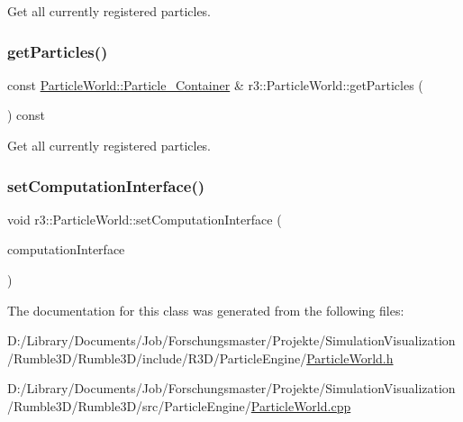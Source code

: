 Get all currently registered particles. \mbox{\label{classr3_1_1_particle_world_ab816d6bca8b42fdf16170275087008f0}} 
\subsubsection{\texorpdfstring{get\+Particles()}{getParticles()}\hspace{0.1cm}{\footnotesize\ttfamily [2/2]}}
{\footnotesize\ttfamily const \mbox{\hyperlink{classr3_1_1_particle_world_aa354f6786c0837674fe8286f00465631}{Particle\+World\+::\+Particle\+\_\+\+Container}} \& r3\+::\+Particle\+World\+::get\+Particles (\begin{DoxyParamCaption}{ }\end{DoxyParamCaption}) const}

Get all currently registered particles. \mbox{\label{classr3_1_1_particle_world_adf5630d53659e9ced254d33990f15a9d}} 
\subsubsection{\texorpdfstring{set\+Computation\+Interface()}{setComputationInterface()}}
{\footnotesize\ttfamily void r3\+::\+Particle\+World\+::set\+Computation\+Interface (\begin{DoxyParamCaption}\item[{\mbox{\hyperlink{classr3_1_1_particle_engine_c_i}{Particle\+Engine\+CI}} $\ast$}]{computation\+Interface }\end{DoxyParamCaption})}



The documentation for this class was generated from the following files\+:\begin{DoxyCompactItemize}
\item 
D\+:/\+Library/\+Documents/\+Job/\+Forschungsmaster/\+Projekte/\+Simulation\+Visualization/\+Rumble3\+D/\+Rumble3\+D/include/\+R3\+D/\+Particle\+Engine/\mbox{\hyperlink{_particle_world_8h}{Particle\+World.\+h}}\item 
D\+:/\+Library/\+Documents/\+Job/\+Forschungsmaster/\+Projekte/\+Simulation\+Visualization/\+Rumble3\+D/\+Rumble3\+D/src/\+Particle\+Engine/\mbox{\hyperlink{_particle_world_8cpp}{Particle\+World.\+cpp}}\end{DoxyCompactItemize}
